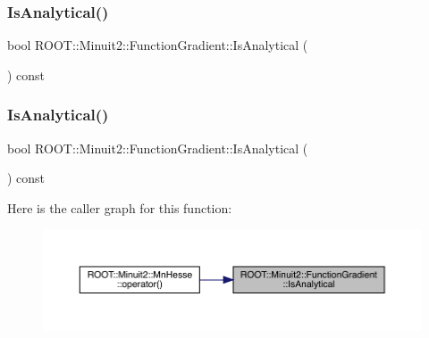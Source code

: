 \subsubsection{\texorpdfstring{IsAnalytical()}{IsAnalytical()}\hspace{0.1cm}{\footnotesize\ttfamily [1/2]}}
{\footnotesize\ttfamily bool R\+O\+O\+T\+::\+Minuit2\+::\+Function\+Gradient\+::\+Is\+Analytical (\begin{DoxyParamCaption}{ }\end{DoxyParamCaption}) const\hspace{0.3cm}{\ttfamily [inline]}}

\mbox{\label{classROOT_1_1Minuit2_1_1FunctionGradient_a34dd6c6a7d699a149edfbb3328c525db}} 
\subsubsection{\texorpdfstring{IsAnalytical()}{IsAnalytical()}\hspace{0.1cm}{\footnotesize\ttfamily [2/2]}}
{\footnotesize\ttfamily bool R\+O\+O\+T\+::\+Minuit2\+::\+Function\+Gradient\+::\+Is\+Analytical (\begin{DoxyParamCaption}{ }\end{DoxyParamCaption}) const\hspace{0.3cm}{\ttfamily [inline]}}

Here is the caller graph for this function\+:\nopagebreak
\begin{figure}[H]
\begin{center}
\leavevmode
\includegraphics[width=350pt]{d3/d48/classROOT_1_1Minuit2_1_1FunctionGradient_a34dd6c6a7d699a149edfbb3328c525db_icgraph}
\end{center}
\end{figure}
\mbox{\label{classROOT_1_1Minuit2_1_1FunctionGradient_a441801769f9021ade74b724584731791}} 
